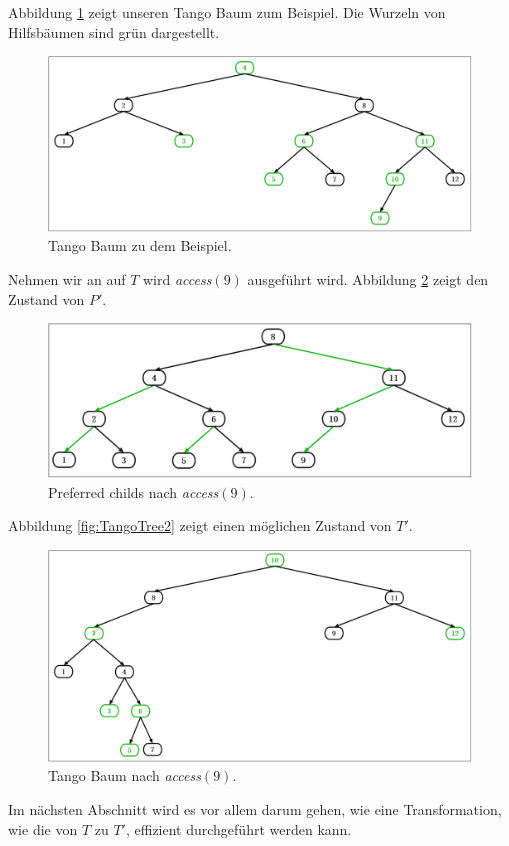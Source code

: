 \documentclass[a4paper,12pt]{article}
\begin{document}
\noindent Abbildung \ref{fig:Tangobaum} zeigt unseren Tango Baum zum Beispiel. Die Wurzeln von Hilfsbäumen sind grün dargestellt.

\begin{figure}[h]
	\centering
	\includegraphics[width=1\textwidth]{"Medien/Tango/Tangobaum"}
	\caption{Tango Baum zu dem Beispiel. }
	\label{fig:Tangobaum}
\end{figure}
\noindent Nehmen wir an auf $T$ wird \textit{access}$\left(9\right)$ ausgeführt wird. Abbildung \ref{fig:prefChilds2} zeigt den Zustand von $P'$.

\begin{figure}[h]
	\centering
	\includegraphics[width=1\textwidth]{"Medien/Tango/prefChilds2"}
	\caption{Preferred childs nach  \textit{access}$\left(9\right)$. }
	\label{fig:prefChilds2}
\end{figure}

Abbildung \ref{fig:TangoTree2} zeigt einen möglichen Zustand von $T'$.
\begin{figure}[h]
	\centering
	\includegraphics[width=1\textwidth]{"Medien/Tango/Tangobaum2"}
	\caption{Tango Baum nach  \textit{access}$\left(9\right)$. }
	\label{fig:Tangobaum2}
\end{figure}
\noindent Im nächsten Abschnitt wird es vor allem darum gehen, wie eine Transformation, wie die von $T$ zu $T'$, effizient durchgeführt werden kann.
\end{document}
